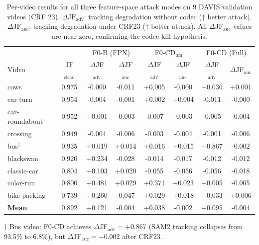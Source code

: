 \begin{table}[t]
\centering
\small
\caption{Per-video results for all three feature-space attack modes on 9 DAVIS validation videos (CRF 23). $\Delta\text{JF}_\text{adv}$: tracking degradation without codec (↑ better attack). $\Delta\text{JF}_\text{auc}$: tracking degradation under CRF23 (↑ better attack). All $\Delta\text{JF}_\text{auc}$ values are near zero, confirming the codec-kill hypothesis.}
\label{tab:per_video}
\begin{tabular}{lc|cc|cc|cc}
\toprule
& & \multicolumn{2}{c|}{F0-B (FPN)} & \multicolumn{2}{c|}{F0-CD$_\text{nm}$} & \multicolumn{2}{c}{F0-CD (Full)} \\
Video & JF$_\text{clean}$ & $\Delta$JF$_\text{adv}$ & $\Delta$JF$_\text{auc}$ & $\Delta$JF$_\text{adv}$ & $\Delta$JF$_\text{auc}$ & $\Delta$JF$_\text{adv}$ & $\Delta$JF$_\text{auc}$ \\
\midrule
cows & 0.975 & -0.000 & -0.011 & +0.005 & -0.000 & +0.036 & +0.001 \\
car-turn & 0.954 & -0.004 & -0.001 & +0.002 & +0.004 & -0.011 & -0.000 \\
car-roundabout & 0.952 & +0.001 & -0.003 & -0.007 & -0.003 & -0.005 & -0.004 \\
crossing & 0.949 & -0.004 & -0.006 & -0.003 & -0.004 & -0.001 & -0.006 \\
bus$^\dagger$ & 0.935 & +0.019 & +0.014 & +0.016 & +0.015 & +0.867 & -0.002 \\
blackswan & 0.920 & +0.234 & -0.028 & -0.014 & -0.017 & -0.012 & -0.012 \\
classic-car & 0.804 & +0.103 & +0.020 & -0.055 & -0.056 & -0.056 & -0.018 \\
color-run & 0.800 & +0.481 & +0.029 & +0.371 & +0.023 & +0.005 & -0.005 \\
bike-packing & 0.739 & +0.260 & -0.047 & +0.029 & +0.018 & +0.033 & +0.006 \\
\midrule
\textbf{Mean} & 0.892 & +0.121 & -0.004 & +0.038 & -0.002 & +0.095 & -0.004 \\
\bottomrule
\end{tabular}
\begin{flushleft}
\footnotesize $\dagger$ Bus video: F0-CD achieves $\Delta$JF$_\text{adv}=+0.867$ (SAM2 tracking collapses from 93.5\% to 6.8\%), but $\Delta$JF$_\text{auc}=-0.002$ after CRF23.
\end{flushleft}
\end{table}